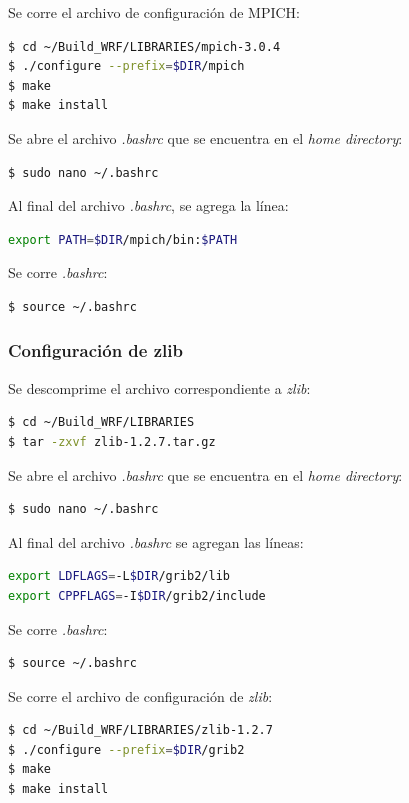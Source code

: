 \documentclass[12pt,letter]{article}
\begin{document}
\noindent Se corre el archivo de configuraci\'on de MPICH:
\begin{lstlisting}[language=bash]
$ cd ~/Build_WRF/LIBRARIES/mpich-3.0.4
$ ./configure --prefix=$DIR/mpich
$ make
$ make install
\end{lstlisting}

\noindent Se abre el archivo \textit{.bashrc} que se encuentra en el \textit{home directory}:
\begin{lstlisting}[language=bash]
$ sudo nano ~/.bashrc
\end{lstlisting}

\noindent Al final del archivo \textit{.bashrc}, se agrega la l\'inea:
\begin{lstlisting}[language=bash]
export PATH=$DIR/mpich/bin:$PATH
\end{lstlisting}

\noindent Se corre \textit{.bashrc}:
\begin{lstlisting}[language=bash]
$ source ~/.bashrc
\end{lstlisting}

\subsubsection*{Configuraci\'on de zlib}
Se descomprime el archivo correspondiente a \textit{zlib}:

\begin{lstlisting}[language=bash]
$ cd ~/Build_WRF/LIBRARIES
$ tar -zxvf zlib-1.2.7.tar.gz 
\end{lstlisting}

\noindent Se abre el archivo \textit{.bashrc} que se encuentra en el \textit{home directory}:
\begin{lstlisting}[language=bash]
$ sudo nano ~/.bashrc
\end{lstlisting}

\noindent Al final del archivo \textit{.bashrc} se agregan las líneas:
\begin{lstlisting}[language=bash]
export LDFLAGS=-L$DIR/grib2/lib
export CPPFLAGS=-I$DIR/grib2/include
\end{lstlisting}

\noindent Se corre \textit{.bashrc}:
\begin{lstlisting}[language=bash]
$ source ~/.bashrc
\end{lstlisting}

\noindent Se corre el archivo de configuraci\'on de \textit{zlib}:
\begin{lstlisting}[language=bash]
$ cd ~/Build_WRF/LIBRARIES/zlib-1.2.7
$ ./configure --prefix=$DIR/grib2
$ make
$ make install
\end{lstlisting}
\end{document}
